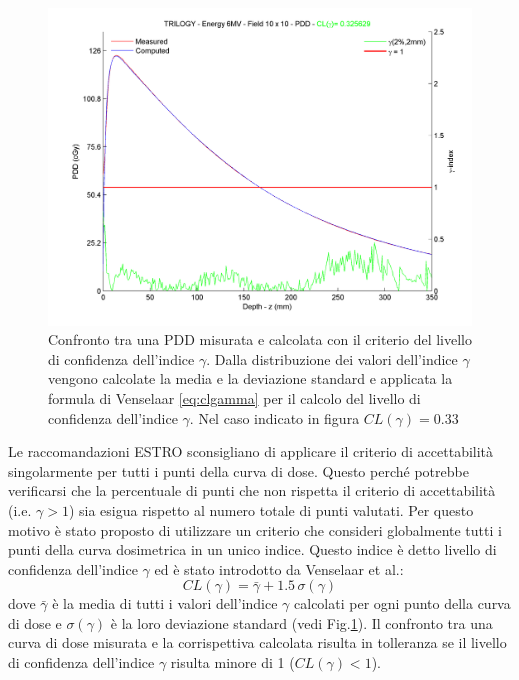\begin{figure}[!t]
\centering
\includegraphics[width=.9\textwidth]{./cap2/pdd10x10.png}
\caption{Confronto tra una PDD misurata e calcolata con il criterio del livello di confidenza dell'indice $\gamma$. Dalla distribuzione dei valori dell'indice $\gamma$ vengono calcolate la media e la deviazione standard e applicata la formula di Venselaar \eqref{eq:clgamma} per il calcolo del livello di confidenza dell'indice $\gamma$. Nel caso indicato in figura $CL(\gamma)=0.33$}
\label{fig:gamma10x10}
\end{figure}

Le raccomandazioni ESTRO sconsigliano di applicare il criterio di accettabilità singolarmente per tutti i punti della curva di dose. Questo perché potrebbe verificarsi che la percentuale di punti che non rispetta il criterio di accettabilità (i.e. $\gamma > 1$) sia esigua rispetto al numero totale di punti valutati. Per questo motivo è stato proposto di utilizzare un criterio che consideri globalmente tutti i punti della curva dosimetrica in un unico indice. Questo indice è detto livello di confidenza dell'indice $\gamma$ ed è stato introdotto da Venselaar et al.\cite{Venselaar2001}:
\begin{equation}
CL(\gamma) = \bar{\gamma} + 1.5\,\sigma(\gamma)
\label{eq:clgamma}
\end{equation}
dove $\bar{\gamma}$ è la media di tutti i valori dell'indice $\gamma$ calcolati per ogni punto della curva di dose e $\sigma(\gamma)$ è la loro deviazione standard (vedi Fig.\ref{fig:gamma10x10}).
Il confronto tra una curva di dose misurata e la corrispettiva calcolata risulta in tolleranza se il livello di confidenza dell'indice $\gamma$ risulta minore di 1 ($CL(\gamma) < 1$).


